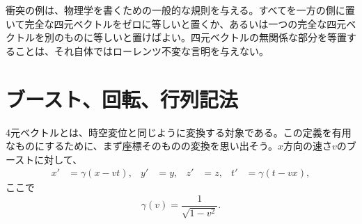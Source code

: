 衝突の例は、物理学を書くための一般的な規則を与える。すべてを一方の側に置いて完全な四元ベクトルをゼロに等しいと置くか、あるいは一つの完全な四元ベクトルを別のものに等しいと置けばよい。四元ベクトルの無関係な部分を等置することは、それ自体ではローレンツ不変な言明を与えない。

\section{ブースト、回転、行列記法}

4元ベクトルとは、時空変位と同じように変換する対象である。この定義を有用なものにするために、まず座標そのものの変換を思い出そう。\(x\)方向の速さ\(v\)のブーストに対して、
\begin{align}
  x'&=\gamma(x-vt), & y'&=y, & z'&=z,
  & t'&=\gamma(t-vx),                                      \label{eq:l6-boost}
\end{align}
ここで
\begin{equation}
  \gamma(v)=\frac{1}{\sqrt{1-v^2}}.
\end{equation}

\begin{classroomqa}
\end{classroomqa}

